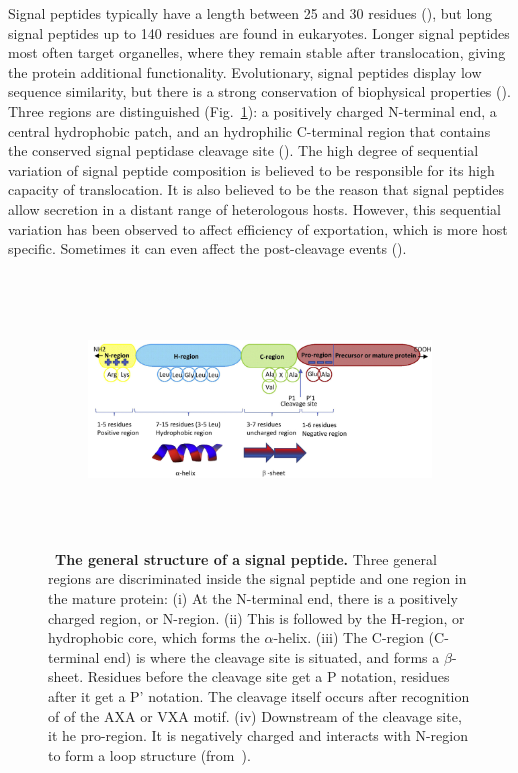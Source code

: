 Signal peptides typically have a length between 25 and 30 residues
(\cite{von1990}),
but long signal peptides up to 140 residues are found in eukaryotes.
Longer signal peptides most often target organelles, 
where they remain stable after translocation, giving the protein additional functionality.
Evolutionary, signal peptides  display low sequence similarity,
but there is a strong conservation of biophysical properties
(\cite{paetzel2002}).
Three regions are distinguished 
(Fig.~\ref{fig:signal_peptide_structure}):
a positively charged N-terminal end,
a central hydrophobic patch,
and an hydrophilic C-terminal region that contains the conserved signal peptidase cleavage site
(\cite{orfanoudaki2017}).
The high degree of sequential variation of signal peptide composition is believed to be responsible for its high capacity of translocation.
It is also believed to be the reason that signal peptides allow secretion in a distant range of heterologous hosts.
However, this sequential variation has been observed to affect efficiency of exportation, which is more host specific.
Sometimes it can even affect the post-cleavage events 
(\cite{owji2018}).

~\begin{figure}[h!]
	\centering
	~\begin{subfigure}[b]{\linewidth}
		\includegraphics[width=\linewidth]
{./literature_review/subcellular_location/signal_peptides/img/signal_peptide_structure.png}
	~\end{subfigure}
	\caption{~\textbf{The general structure of a signal peptide.}
		Three general regions are discriminated inside the signal peptide and one region in the mature protein:
		(i) At the N-terminal end, there is a positively charged region, or N-region.
		(ii) This is followed by the H-region, or hydrophobic core, which forms the $\alpha$-helix.
		(iii) The C-region (C-terminal end) is where the cleavage site is situated,
		and forms a $\beta$-sheet.
		Residues before the cleavage site get a P notation,
		residues after it get a P' notation.
		The cleavage itself occurs after recognition of of the AXA or VXA motif.
		(iv) Downstream of the cleavage site, it he pro-region. 
		It is negatively charged and interacts with N-region to form a loop structure
		(from~\cite{owji2018}).}
	\label{fig:signal_peptide_structure}
~\end{figure}

